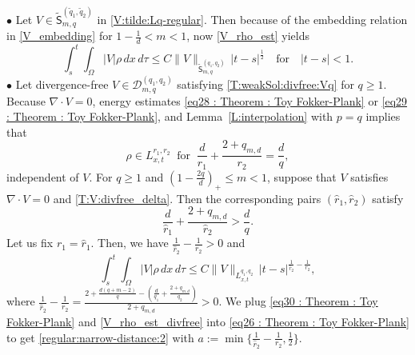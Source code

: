 \documentclass{amsart}
\numberwithin{equation}{section}
\begin{document}
\noindent $\bullet$ Let $V\in \tilde{\mathsf{S}}_{m,q}^{(\tilde{q}_1, \tilde{q}_2)} $ in \eqref{V:tilde:Lq-regular}. %
Then because of the embedding relation in \eqref{V_embedding} for $1-\frac{1}{d}< m<1$, now \eqref{V_rho_est} yields
 \begin{equation*}\label{V_rho_est_tilde}
\int_{s}^{t} \int_{\Omega}  | V |\rho  \,dx\,d\tau \leq C\|V\|_{\tilde{\mathsf{S}}_{m,q}^{(q_1,q_2)}} \,|t-s|^{\frac{1}{2}} \quad \mbox{for} \quad |t-s| <1 .
\end{equation*}
$\bullet$ Let divergence-free $V\in \mathcal{D}_{m,q}^{(q_1,q_2)}$ satisfying \eqref{T:weakSol:divfree:Vq} for $q\geq 1$. Because $\nabla \cdot V=0$, energy estimates \eqref{eq28 : Theorem : Toy Fokker-Plank} or \eqref{eq29 : Theorem : Toy Fokker-Plank}, %
and Lemma~\ref{L:interpolation} with $p=q$ implies that 
\[
\rho \in L_{x,t}^{r_1,r_2}  \ \text{ for }  \  \frac{d}{r_1} + \frac{2+q_{m,d}}{r_2} = \frac{d}{q},
\]
independent of $V$. For $q\geq 1$ and $ (1-\frac{2q}{d})_{+} \leq m < 1$, suppose that $V$ satisfies $\nabla \cdot V =0$ and \eqref{T:V:divfree_delta}.
Then the corresponding pairs $(\hat{r}_1, \hat{r}_2)$ satisfy
\[
\frac{d}{\hat{r}_1} + \frac{2+q_{m,d}}{\hat{r}_2} > \frac{d}{q}.
\]
Let us fix $r_1 = \hat{r}_1$. Then, we have $\frac{1}{\hat{r}_2} - \frac{1}{r_2} > 0$ and
 \begin{equation}\label{V_rho_est_divfree}
\int_{s}^{t} \int_{\Omega}  | V |\rho  \,dx\,d\tau \leq C\|V\|_{L_{x,t}^{q_1,q_2}} \,|t-s|^{\frac{1}{\hat{r}_2} - \frac{1}{r_2}},
\end{equation}
where $\frac{1}{\hat{r}_2} - \frac{1}{r_2}= \frac{2+\frac{d(q+m-2)}{q} - \left(\frac{d}{q_1} + \frac{2+q_{m,d}}{q_2}\right)}{2+q_{m,d}}>0$.
We plug \eqref{eq30 : Theorem : Toy Fokker-Plank} and \eqref{V_rho_est_divfree}  into \eqref{eq26 : Theorem : Toy Fokker-Plank} to get \eqref{regular:narrow-distance:2} with $a:=\min \{\frac{1}{\hat{r}_2} - \frac{1}{r_2}, \frac{1}{2} \}$.
\end{document}
